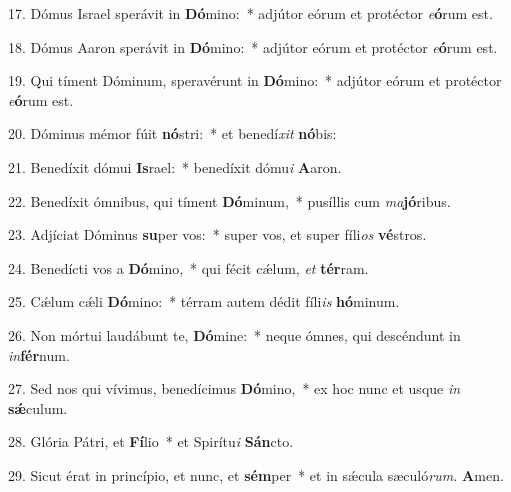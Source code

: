 \item 17. Dómus Israel sperávit in \textbf{Dó}mino:~* adjútor eórum et protéctor \textit{e}\textbf{ó}rum est.

\item 18. Dómus Aaron sperávit in \textbf{Dó}mino:~* adjútor eórum et protéctor \textit{e}\textbf{ó}rum est.

\item 19. Qui tíment Dóminum, speravérunt in \textbf{Dó}mino:~* adjútor eórum et protéctor \textit{e}\textbf{ó}rum est.

\item 20. Dóminus mémor fúit \textbf{nó}stri:~* et benedí\textit{xit} \textbf{nó}bis:

\item 21. Benedíxit dómui \textbf{Is}rael:~* benedíxit dómu\textit{i} \textbf{A}aron.

\item 22. Benedíxit ómnibus, qui tíment \textbf{Dó}minum,~* pusíllis cum \textit{ma}\textbf{jó}ribus.

\item 23. Adjíciat Dóminus \textbf{su}per vos:~* super vos, et super fíli\textit{os} \textbf{vé}stros.

\item 24. Benedícti vos a \textbf{Dó}mino,~* qui fécit cǽlum, \textit{et} \textbf{tér}ram.

\item 25. Cǽlum cǽli \textbf{Dó}mino:~* térram autem dédit fíli\textit{is} \textbf{hó}minum.

\item 26. Non mórtui laudábunt te, \textbf{Dó}mine:~* neque ómnes, qui descéndunt in \textit{in}\textbf{fér}num.

\item 27. Sed nos qui vívimus, benedícimus \textbf{Dó}mino,~* ex hoc nunc et usque \textit{in} \textbf{sǽ}culum.

\item 28. Glória Pátri, et \textbf{Fí}lio~* et Spirítu\textit{i} \textbf{Sán}cto.

\item 29. Sicut érat in princípio, et nunc, et \textbf{sém}per~* et in sǽcula sæculó\textit{rum.} \textbf{A}men.
